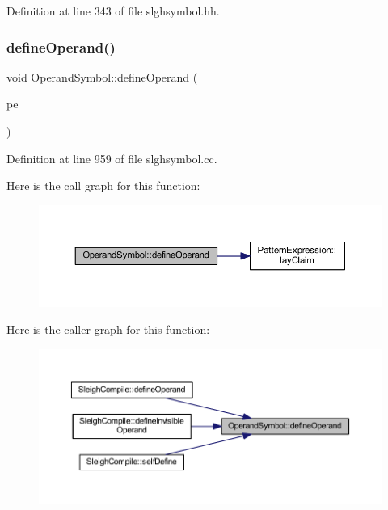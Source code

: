Definition at line 343 of file slghsymbol.\+hh.

\mbox{\label{class_operand_symbol_a5f2bc99daa08301586d3c8dd00261033}} 
\subsubsection{\texorpdfstring{defineOperand()}{defineOperand()}\hspace{0.1cm}{\footnotesize\ttfamily [1/2]}}
{\footnotesize\ttfamily void Operand\+Symbol\+::define\+Operand (\begin{DoxyParamCaption}\item[{\mbox{\hyperlink{class_pattern_expression}{Pattern\+Expression}} $\ast$}]{pe }\end{DoxyParamCaption})}



Definition at line 959 of file slghsymbol.\+cc.

Here is the call graph for this function\+:
\nopagebreak
\begin{figure}[H]
\begin{center}
\leavevmode
\includegraphics[width=350pt]{class_operand_symbol_a5f2bc99daa08301586d3c8dd00261033_cgraph}
\end{center}
\end{figure}
Here is the caller graph for this function\+:
\nopagebreak
\begin{figure}[H]
\begin{center}
\leavevmode
\includegraphics[width=350pt]{class_operand_symbol_a5f2bc99daa08301586d3c8dd00261033_icgraph}
\end{center}
\end{figure}
\mbox{\label{class_operand_symbol_af779510f6032b577ddfe3453fccfea2f}} 
